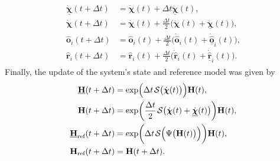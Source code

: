 \begin{align}
    \begin{split}
        \underline{\dot{\boldsymbol{\chi}}}(t + \Delta t) &= \dot{\boldsymbol{\chi}}(t) + \Delta t \ddot{\underline{\boldsymbol{\chi}}}(t),\\
        \dot{\boldsymbol{\chi}}(t + \Delta t) &= \dot{\boldsymbol{\chi}}(t) + \frac{\Delta t}{2} \bigl(\ddot{\boldsymbol{\chi}}(t) + \underline{\ddot{\boldsymbol{\chi}}}(t)\bigr),\\
        \widehat{\mathbf{o}}_i(t + \Delta t) &= \widehat{\mathbf{o}}_i(t) + \frac{\Delta t}{2} \bigl(\dot{\widehat{\mathbf{o}}}_i(t) + \underline{\dot{\widehat{\mathbf{o}}}}_i(t)\bigr),\\
        \widehat{\mathbf{r}}_i(t + \Delta t) &= \widehat{\mathbf{r}}_i(t) + \frac{\Delta t}{2} \bigl(\dot{\widehat{\mathbf{r}}}_i(t) + \underline{\dot{\widehat{\mathbf{r}}}}_i(t)\bigr).
    \end{split}
\end{align}
Finally, the update of the system's state and reference model was given by
\begin{align}
    \begin{split}
        \underline{\mathbf{H}}(t +\Delta t) &= \exp\Bigl(\Delta t\SL\bigl(\dot{\boldsymbol{\chi}}(t)\bigr)\Bigr)\mathbf{H}(t),\\
        \mathbf{H}(t + \Delta t) &= \exp\biggl(\frac{\Delta t}{2}\SL[\dot{\boldsymbol{\chi}}(t) + \underline{\dot{\boldsymbol{\chi}}}(t)]\biggr)\mathbf{H}(t),\\
        \underline{\mathbf{H}}_\text{ref}(t +\Delta t) &= \exp\biggl(\Delta t\SL\Bigl(\Psi\bigl(\mathbf{H}(t)\bigr)\Bigr)\biggr)\mathbf{H}(t),\\
        \mathbf{H}_\text{ref} (t + \Delta t) &= \mathbf{H}(t + \Delta t).
    \end{split}
\end{align}

